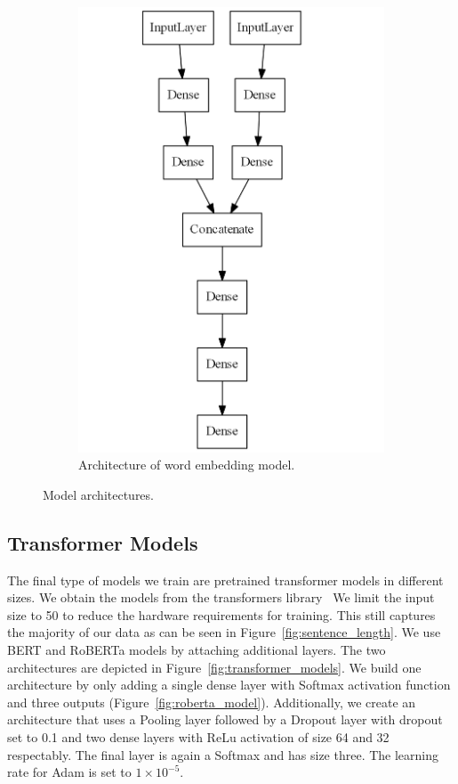 \documentclass[acmsmall,nonacm]{acmart}
\begin{document}
\begin{figure}[h!]
\begin{subfigure}[c]{0.35\textwidth}
    \includegraphics[width=\textwidth]{assets/embedded_model.png}
    \caption{Architecture of word embedding model.}
  \label{fig:embedding_model}
  \end{subfigure}
  \caption{Model architectures.}
  \label{fig:model_architectures}
\end{figure}




\subsection{Transformer Models} \label{sec:method_transformer}
The final type of models we train are pretrained transformer models in different sizes. We obtain the models from the transformers library~\cite{transformers-wolf-etal-2020} We limit the input size to 50 to reduce the hardware requirements for training. This still captures the majority of our data as can be seen in Figure~\ref{fig:sentence_length}. We use BERT and RoBERTa models by attaching additional layers. The two architectures are depicted in Figure~\ref{fig:transformer_models}. We build one architecture by only adding a single dense layer with Softmax activation function and three outputs (Figure~\ref{fig:roberta_model}). Additionally, we create an architecture that uses a Pooling layer followed by a Dropout layer with dropout set to 0.1 and two dense layers with ReLu activation of size 64 and 32 respectably. The final layer is again a Softmax and has size three.  The learning rate for Adam is set to $1\times10^{-5}$.
\end{document}
